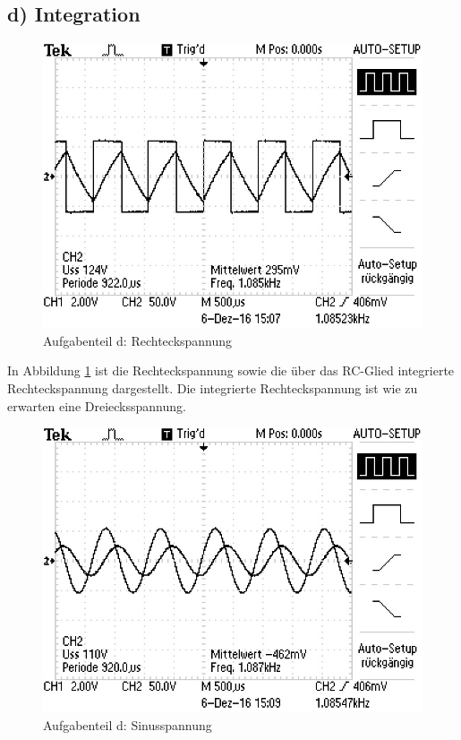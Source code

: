 \subsection{d) Integration}

\begin{figure}
	\centering
	\includegraphics[angle=90]{bilder/ALL0001/F0001TEK.JPG}
	\caption{Aufgabenteil d: Rechteckspannung}
	\label{fig:rechteck}
\end{figure}

In Abbildung \ref{fig:rechteck} ist die Rechteckspannung sowie die über das RC-Glied integrierte Rechteckspannung dargestellt.
Die integrierte Rechteckspannung ist wie zu erwarten eine Dreiecksspannung.


\begin{figure}
	\centering
	\includegraphics[angle=90]{bilder/ALL0002/F0002TEK.JPG}
	\caption{Aufgabenteil d: Sinusspannung}
	\label{fig:sinus}
\end{figure}

